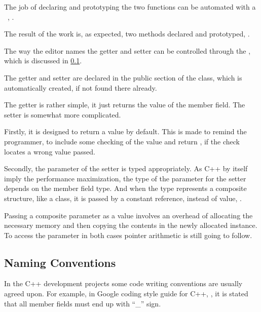 The job of declaring and prototyping the two functions can be automated with a \jbmps\ , .


The result of the  work is, as expected, two methods declared and prototyped, .


The way the editor names the getter and setter can be controlled through the  , which
is discussed in \ref{namingconventions}.

The getter and setter are declared in the public section of the class, which is automatically created, if
not found there already.

The getter is rather simple, it just returns the value of the member field.
The setter is somewhat more complicated. 

Firstly, it is designed to return a  value by default. This is made
to remind the programmer, to include some checking of the value and return , if the check locates a wrong value passed. 

Secondly, the parameter of the setter is typed appropriately. As C++ by itself imply the performance maximization, the type
of the parameter for the setter depends on the member field type. And when the type represents a composite
structure, like a class, it is passed by a constant reference, instead of value, .


Passing a composite parameter as a value involves an overhead of allocating the necessary memory and 
then copying the contents in the newly allocated instance. To access the parameter in both cases pointer
arithmetic is still going to follow.

\subsection{Naming Conventions}
\label{namingconventions}

In the C++ development projects some code writing conventions are usually agreed upon. For example, 
in Google coding style guide for C++, \cite{googlecppstyle}, it is stated that all member fields must end up with ``\_'' sign.

